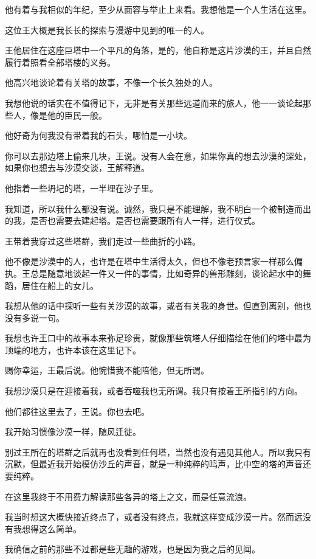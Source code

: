 \documentclass[UTF8]{article}
\begin{document}
\par 他有着与我相似的年纪，至少从面容与举止上来看。我想他是一个人生活在这里。
\par 这位王大概是我长长的探索与漫游中见到的唯一的人。
\\[0.6cm]
\par 王他居住在这座巨塔中一个平凡的角落，是的，他自称是这片沙漠的王，并且自然履行着照看全部塔楼的义务。
\par 他高兴地谈论着有关塔的故事，不像一个长久独处的人。
\par 我想他说的话实在不值得记下，无非是有关那些远道而来的旅人，他一一谈论起那些人，像是他的臣民一般。
\par 他好奇为何我没有带着我的石头，哪怕是一小块。
\par 你可以去那边塔上偷来几块，王说。没有人会在意，如果你真的想去沙漠的深处，如果你也想去与沙漠交谈，王解释道。
\par 他指着一些坍圮的塔，一半埋在沙子里。
\par 我知道，所以我什么都没有说。诚然，我只是不能理解，我不明白一个被制造而出的我，是否也需要去建起塔。是否也需要跟所有人一样，进行仪式。
\par 王带着我穿过这些塔群，我们走过一些曲折的小路。
\par 他不像是沙漠中的人，也许是在塔中生活得太久，但也不像老预言家一样那么偏执。王总是随意地谈起一件又一件的事情，比如奇异的兽形雕刻，谈论起水中的舞蹈，居住在船上的女儿。
\par 我想从他的话中探听一些有关沙漠的故事，或者有关我的身世。但直到离别，他也没有多说一句。
\par 我想也许王口中的故事本来弥足珍贵，就像那些筑塔人仔细描绘在他们的塔中最为顶端的地方，也许本该在这里记下。
\par 赐你幸运，王最后说。他惋惜我不能陪他，但无所谓。
\par 我想沙漠只是在迎接着我，或者吞噬我也无所谓。我只有按着王所指引的方向。
\par 他们都往这里去了，王说。你也去吧。
\\[0.6cm]
\par 我开始习惯像沙漠一样，随风迁徙。
\par 别过王所在的塔群之后就再也没看到任何塔，当然也没有遇见其他人。所以我只有沉默，但最近我开始模仿沙丘的声音，就是一种纯粹的鸣声，比中空的塔的声音还要纯粹。
\par 在这里我终于不用费力解读那些各异的塔上之文，而是任意流浪。
\par 我当时想这大概快接近终点了，或者没有终点，我就这样变成沙漠一片。然而远没有我想得这么简单。
\par 我确信之前的那些不过都是些无趣的游戏，也是因为我之后的见闻。
\end{document}
